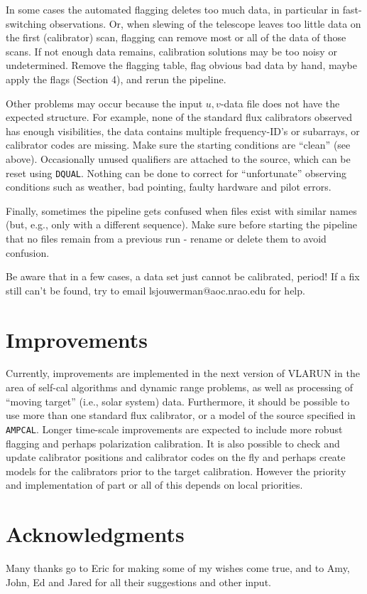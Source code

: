 In some cases the automated flagging deletes too much data, in
particular in fast-switching observations. Or, when slewing of the
telescope leaves too little data on the first (calibrator) scan,
flagging can remove most or all of the data of those scans. If not
enough data remains, calibration solutions may be too noisy or
undetermined. Remove the flagging table, flag obvious bad data by
hand, maybe apply the flags (Section 4), and rerun the pipeline.

Other problems may occur because the input $u,v$-data file does not
have the expected structure. For example, none of the standard flux
calibrators observed has enough visibilities, the data contains
multiple frequency-ID's or subarrays, or calibrator codes are
missing. Make sure the starting conditions are ``clean'' (see
above). Occasionally unused qualifiers are attached to the source,
which can be reset using {\tt DQUAL}. Nothing can be done to correct
for ``unfortunate'' observing conditions such as weather, bad
pointing, faulty hardware and pilot errors.

Finally, sometimes the pipeline gets confused when files exist with
similar names (but, e.g., only with a different sequence). Make sure
before starting the pipeline that no files remain from a previous run
- rename or delete them to avoid confusion.

Be aware that in a few cases, a data set just cannot be
calibrated, period!
If a fix still can't be found, try to email lsjouwerman@aoc.nrao.edu
for help.

\section{Improvements}
Currently, improvements are implemented in the next version of VLARUN in the area of self-cal
algorithms and dynamic range problems, as well as processing of
``moving target'' (i.e., solar system) data. Furthermore, it should be
possible to use more than one standard flux calibrator, or a model of
the source specified in {\tt AMPCAL}. Longer time-scale improvements
are expected to
include more robust flagging and perhaps polarization calibration. It
is also possible to check and update calibrator positions and
calibrator codes on the fly and perhaps create models for the
calibrators prior to the target calibration. However the priority and
implementation of part or all of this depends on local priorities.

\section*{Acknowledgments}
Many thanks go to Eric for making some of my wishes come true, and to
Amy, John, Ed and Jared for all their suggestions and other input.

